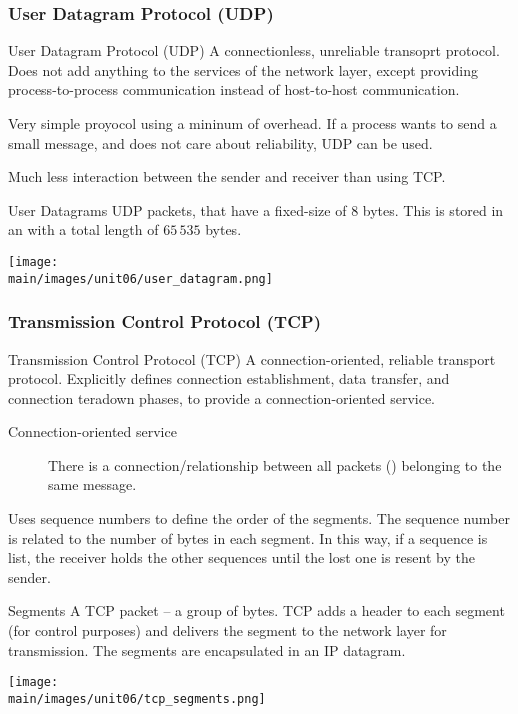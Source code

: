 \documentclass[\main/notes.tex]{subfiles}
\begin{document}
				\subsubsection{User Datagram Protocol (UDP)}
					\begin{definition}{User Datagram Protocol (UDP)}
						A connectionless, unreliable transoprt protocol. Does not add anything to the services of the network layer, except providing process-to-process communication instead of host-to-host communication.

						Very simple proyocol using a mininum of overhead. If a process wants to send a small message, and does not care about reliability, UDP can be used.

						Much less interaction between the sender and receiver than using TCP.
					\end{definition}
					\begin{definition}{User Datagrams}
						UDP packets, that have a fixed-size  of $8$ bytes. This is stored in an  with a total length of $65\,535$ bytes.
						\begin{center}
							\texttt{[image: \\main/images/unit06/user\_datagram.png]}
						\end{center}
					\end{definition}
				\subsubsection{Transmission Control Protocol (TCP)}
					\begin{definition}{Transmission Control Protocol (TCP)}
						A connection-oriented, reliable transport protocol. Explicitly defines connection establishment, data transfer, and connection teradown phases, to provide a connection-oriented service.
						\begin{indentparagraph}
							\begin{description}
								\item[Connection-oriented service] There is a connection/relationship between all packets () belonging to the same message.
							\end{description}
						\end{indentparagraph}
						Uses sequence numbers to define the order of the segments. The sequence number is related to the number of bytes in each segment. In this way, if a sequence is list, the receiver holds the other sequences until the lost one is resent by the sender.
					\end{definition}
					\begin{definition}{Segments}
						A TCP packet -- a group of bytes. TCP adds a header to each segment (for control purposes) and delivers the segment to the network layer for transmission. The segments are encapsulated in an IP datagram.
						\begin{center}
							\texttt{[image: \\main/images/unit06/tcp\_segments.png]}
						\end{center}
					\end{definition}
\end{document}
